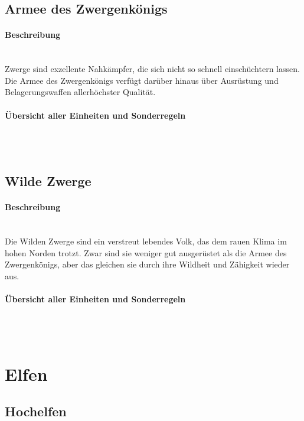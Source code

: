 \documentclass[a4paper,11pt]{report}
\begin{document}
\subsection{Armee des Zwergenkönigs}
\paragraph{Beschreibung}~\\
Zwerge sind exzellente Nahkämpfer, die sich nicht so schnell einschüchtern lassen. Die Armee des Zwergenkönigs verfügt darüber hinaus über Ausrüstung und Belagerungswaffen allerhöchster Qualität.

\paragraph{Übersicht aller Einheiten und Sonderregeln}~\\
%
\\



\subsection{Wilde Zwerge}
\paragraph{Beschreibung}~\\
Die Wilden Zwerge sind ein verstreut lebendes Volk, das dem rauen Klima im hohen Norden trotzt. Zwar sind sie weniger gut ausgerüstet als die Armee des Zwergenkönigs, aber das gleichen sie durch ihre Wildheit und Zähigkeit wieder aus.

\paragraph{Übersicht aller Einheiten und Sonderregeln}~\\
\\



\section{Elfen}
\subsection{Hochelfen}
\end{document}
